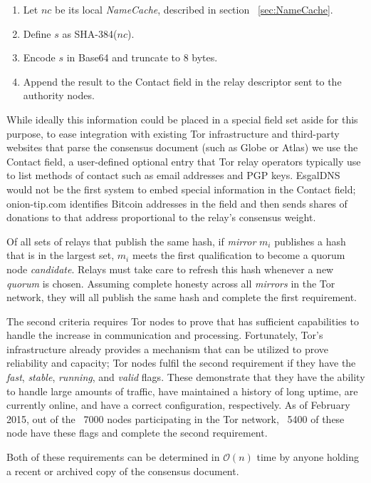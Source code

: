 \begin{enumerate}
	\item Let $ nc $ be its local \emph{NameCache}, described in section ~\ref{sec:NameCache}.
	\item Define $ s $ as SHA-384($ nc $).
	\item Encode $ s $ in Base64 and truncate to 8 bytes.
	\item Append the result to the Contact field in the relay descriptor sent to the authority nodes.
\end{enumerate}

While ideally this information could be placed in a special field set aside for this purpose, to ease integration with existing Tor infrastructure and third-party websites that parse the consensus document (such as Globe or Atlas) we use the Contact field, a user-defined optional entry that Tor relay operators typically use to list methods of contact such as email addresses and PGP keys. EsgalDNS would not be the first system to embed special information in the Contact field; onion-tip.com identifies Bitcoin addresses in the field and then sends shares of donations to that address proportional to the relay's consensus weight.

Of all sets of relays that publish the same hash, if \emph{mirror} $ m_{i} $ publishes a hash that is in the largest set, $ m_{i} $ meets the first qualification to become a quorum node \emph{candidate}. Relays must take care to refresh this hash whenever a new \emph{quorum} is chosen. Assuming complete honesty across all \emph{mirrors} in the Tor network, they will all publish the same hash and complete the first requirement.

The second criteria requires Tor nodes to prove that has sufficient capabilities to handle the increase in communication and processing. Fortunately, Tor's infrastructure already provides a mechanism that can be utilized to prove reliability and capacity; Tor nodes fulfil the second requirement if they have the \emph{fast}, \emph{stable}, \emph{running}, and \emph{valid} flags. These demonstrate that they have the ability to handle large amounts of traffic, have maintained a history of long uptime, are currently online, and have a correct configuration, respectively. As of February 2015, out of the ~7000 nodes participating in the Tor network, ~5400 of these node have these flags and complete the second requirement.

Both of these requirements can be determined in $ \mathcal{O}(n) $ time by anyone holding a recent or archived copy of the consensus document.

